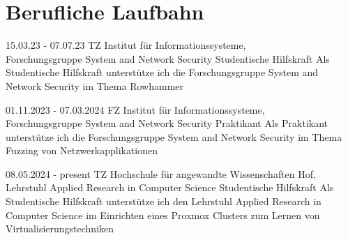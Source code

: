 \section{Berufliche Laufbahn}\label{sec: berufliche-laufbahn}



\jobentry
{15.03.23 - 07.07.23} %
{TZ} %
{Institut für Informationssysteme, \\ Forschungsgruppe System and Network Security \newline} %
{Studentische Hilfskraft} %
{Als Studentische Hilfskraft unterstütze ich die Forschungsgruppe \newline System and Network Security im Thema Rowhammer} %

\jobentry
{01.11.2023 - 07.03.2024}
{FZ}
{Institut für Informationssysteme, \\ Forschungsgruppe System and Network Security \newline}
{Praktikant}
{Als Praktikant unterstütze ich die Forschungsgruppe System and Network Security im Thema Fuzzing von Netzwerkapplikationen}

\jobentry
{08.05.2024 - present}
{TZ}
{Hochschule für angewandte Wissenschaften Hof, \\ Lehrstuhl Applied Research in Computer Science \newline}
{Studentische Hilfskraft}
{Als Studentische Hilfskraft unterstütze ich den Lehrstuhl Applied Research in Computer Science im Einrichten eines
Proxmox Clusters zum Lernen von Virtualisierungstechniken}
